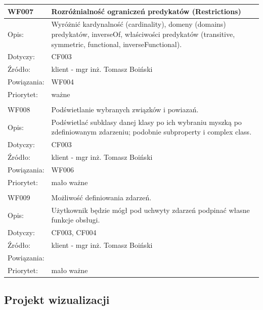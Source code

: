 \documentclass[a4paper,10pt]{article}
\begin{document}
\begin{center}
\begin{tabular}{|m{3cm}|m{9cm}|}
WF007 & Rozróżnialność ograniczeń predykatów (Restrictions) \\ \hline
Opis: & Wyróżnić kardynalność (cardinality), domeny (domains) predykatów, inverseOf, właściwości predykatów (transitive, symmetric, functional, inverseFunctional). \\ \hline
Dotyczy: &  CF003\\ \hline
Źródło: &  klient - mgr inż. Tomasz Boiński \\ \hline
Powiązania: & WF004\\ \hline
Priorytet: & ważne \\ \hline

\multicolumn{2}{c}{} \\
 \hline

WF008 &  Podświetlanie wybranych związków i powiazań.\\ \hline
Opis: &   Podświetlać subklasy danej klasy po ich wybraniu myszką po zdefiniowanym zdarzeniu; podobnie subproperty i complex class. \\ \hline
Dotyczy: &  CF003\\ \hline
Źródło: &  klient - mgr inż. Tomasz Boiński \\ \hline
Powiązania: & WF006\\ \hline
Priorytet: & mało ważne \\ \hline

\multicolumn{2}{c}{} \\
 \hline

WF009 & Możliwość definiowania zdarzeń. \\ \hline
Opis: &   Użytkownik będzie mógł pod uchwyty zdarzeń podpinać własne funkcje obsługi. \\ \hline
Dotyczy: & CF003, CF004  \\ \hline
Źródło: & klient - mgr inż. Tomasz Boiński \\ \hline
Powiązania: & \\ \hline
Priorytet: & mało ważne \\ \hline

\end{tabular}

\end{center}

\subsection{Projekt wizualizacji}
\end{document}
